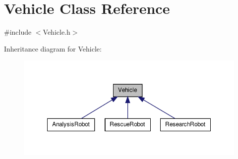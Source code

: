 \hypertarget{class_vehicle}{\section{Vehicle Class Reference}
\label{class_vehicle}
}


{\ttfamily \#include $<$Vehicle.\-h$>$}



Inheritance diagram for Vehicle\-:\nopagebreak
\begin{figure}[H]
\begin{center}
\leavevmode
\includegraphics[width=350pt]{class_vehicle__inherit__graph}
\end{center}
\end{figure}
